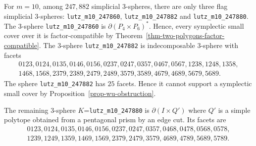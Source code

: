 \documentclass{amsart}
\numberwithin{equation}{section}
\theoremstyle{definition}
\theoremstyle{remark}
\begin{document}
For $m=10$, among $247,882$ simplicial $3$-spheres, there are only three flag simplicial $3$-spheres: \texttt{lutz\_m10\_247860}, \texttt{lutz\_m10\_247882} and \texttt{lutz\_m10\_247880}.
The $3$-sphere \texttt{lutz\_m10\_247860} is $\partial(P_4 \times P_6)^\ast$.
Hence, every symplectic small cover over it is factor-compatible by Theorem~\ref{thm-two-polygons-factor-compatible}.
The $3$-sphere \texttt{lutz\_m10\_247882} is indecomposable $3$-sphere with facets
$$
    \begin{gathered}
        0123, 0124, 0135, 0146, 0156, 0237, 0247, 0357, 0467, 0567, 1238, 1248, 1358,\\
        1468, 1568, 2379, 2389, 2479, 2489, 3579, 3589, 4679, 4689, 5679, 5689.
    \end{gathered}
$$
The sphere \texttt{lutz\_m10\_247882} has $25$ facets. 
Hence it cannot support a symplectic small cover by Proposition~\ref{prop-wu-obstruction}.

The remaining $3$-sphere $K$=\texttt{lutz\_m10\_247880} is $\partial (I \times Q')$ where $Q'$ is a simple polytope obtained from a pentagonal prism by an edge cut.
Its facets are
$$
    \begin{gathered}
        0123, 0124, 0135, 0146, 0156, 0237, 0247, 0357, 0468, 0478, 0568, 0578,\\
        1239, 1249, 1359, 1469, 1569, 2379, 2479, 3579, 4689, 4789, 5689, 5789.
    \end{gathered}
$$
\end{document}
